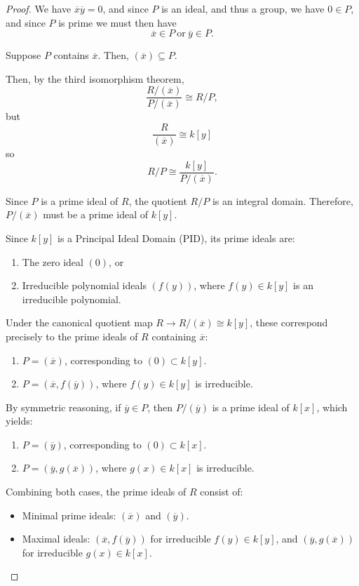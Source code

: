 \documentclass[11pt]{article}
\begin{document}
\begin{proof}
    We have $\overline x \overline y = 0$, and since 
    $P$ is an ideal, and thus a group, we have 
    $0 \in P$, and since $P$ is prime we must then have 
    \[\overline x \in P \ \text{or} \ \overline y \in P.\]

    Suppose $P$ contains $\overline x$. 
    Then, $(\overline x) \subseteq P$. 

    Then, by the third isomorphism theorem,  
    \[\frac{R/(\overline x)}{P / (\overline x)}         \cong R/P,\]
    but 
    \[\frac{R}{(\overline x)} \cong k[y]\]
    so 
    \[R/P \cong \frac{k[y]}{P/(\overline x)}.\]

    Since $P$ is a prime ideal of $R$, the quotient $R/P$ is an integral domain. Therefore, $P/(\overline x)$ must be a prime ideal of $k[y]$. 

    Since $k[y]$ is a Principal Ideal Domain (PID), its prime ideals are:
    \begin{enumerate}
        \item The zero ideal $(0)$, or
        \item Irreducible polynomial ideals $(f(y))$, where $f(y) \in k[y]$ is an irreducible polynomial.
    \end{enumerate}

    Under the canonical quotient map $R \to R/(\overline x) \cong k[y]$, these correspond precisely to the prime ideals of $R$ containing $\overline x$:
    \begin{enumerate}
        \item $P = (\overline x)$, corresponding to $(0) \subset k[y]$.
        \item $P = (\overline x, f(\overline y))$, where $f(y) \in k[y]$ is irreducible.
    \end{enumerate}

    By symmetric reasoning, if $\overline y \in P$, then $P/(\overline y)$ is a prime ideal of $k[x]$, which yields:
    \begin{enumerate}
        \item $P = (\overline y)$, corresponding to $(0) \subset k[x]$.
        \item $P = (\overline y, g(\overline x))$, where $g(x) \in k[x]$ is irreducible.
    \end{enumerate}

    Combining both cases, the prime ideals of $R$ consist of:
    \begin{itemize}
        \item Minimal prime ideals: $(\overline x)$ and $(\overline y)$.
        \item Maximal ideals: $(\overline x, f(\overline y))$ for irreducible $f(y) \in k[y]$, and $(\overline y, g(\overline x))$ for irreducible $g(x) \in k[x]$.
    \end{itemize}
\end{proof}
\end{document}
